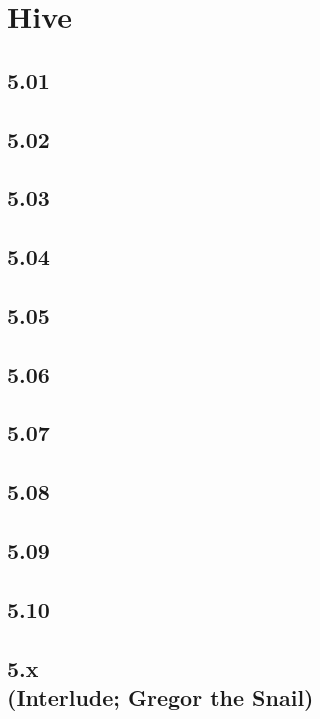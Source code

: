 \part{Hive}
 \chapter{5.01}
 \chapter{5.02}
 \chapter{5.03}
 \chapter{5.04}
 \chapter{5.05}
 \chapter{5.06}
 \chapter{5.07}
 \chapter{5.08}
 \chapter{5.09}
 \chapter{5.10}
 \chapter[5.x (Interlude; Gregor the Snail)]{5.x\\(Interlude; Gregor the Snail)}












